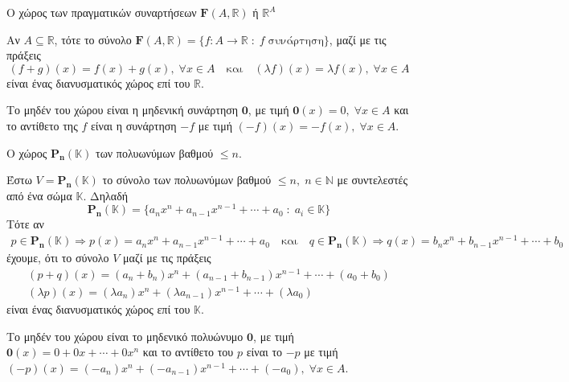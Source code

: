 \begin{example}\label{ex:funs} 
  \textcolor{Col2}{Ο χώρος των πραγματικών συναρτήσεων 
  $\mathbf{F}(A, \mathbb{R})$ ή $\mathbb{R} ^{A}$}

  Αν $ A \subseteq \mathbb{R} $, τότε το σύνολο 
  $ \mathbf{F}{(A, \mathbb{R})} = 
  \{ f \colon A \to \mathbb{R} \; : \; f \; \text{συνάρτηση} \} $, μαζί με 
  τις πράξεις
  \[
    (f+g)(x) = f(x) +g(x), \; \forall x \in A \quad \text{και} 
    \quad (\lambda f)(x)= \lambda f(x), \; \forall x \in A
  \] 
  είναι ένας διανυσματικός χώρος επί του $ \mathbb{R} $.

  Το μηδέν του χώρου είναι η μηδενική συνάρτηση $ \mathbf{0} $, με τιμή 
  $ \mathbf{0}(x)=0, \; \forall x \in A $ και το αντίθετο της $f$ είναι 
  η συνάρτηση $ -f $ με τιμή $ (-f)(x) = - f(x), \; \forall x \in A $.
\end{example}

\begin{example}
  \textcolor{Col2}{Ο χώρος $\mathbf{P_{n}(\mathbb{K})}$ των 
  πολυωνύμων βαθμού $ \leq n $}.

  Έστω $ V = \mathbf{P_{n}}(\mathbb{K}) $ το σύνολο των πολυωνύμων βαθμού 
  $ \leq n, \; n \in \mathbb{N}  $ με συντελεστές από ένα σώμα 
  $ \mathbb{K} $. Δηλαδή 
  \[
    \mathbf{P_{n}}(\mathbb{K}) = \{ a_{n}x^{n}+a_{n-1}x^{n-1}+\cdots +
    a_{0} \; : \; a_{i} \in \mathbb{K} \}  
  \]
  Τότε αν 
  \begin{gather*}
    p \in \mathbf{P_{n}}(\mathbb{K}) \Rightarrow p(x)
    = a_{n}x^{n}+a_{n-1}x^{n-1}+\cdots + a_{0} \quad \text{και} 
    \quad q \in \mathbf{P_{n}}(\mathbb{K}) \Rightarrow 
    q(x) = b_{n}x^{n}+b_{n-1}x^{n-1}+\cdots + b_{0} 
  \end{gather*} 
  έχουμε, ότι το σύνολο $ V $ μαζί με τις πράξεις 
  \begin{gather*}
    (p+q)(x) = (a_{n}+ b_{n})x^{n} + 
    (a_{n-1}+b_{n-1})x^{n-1}+ \cdots + (a_{0}+ b_{0}) \\
    (\lambda p)(x) = (\lambda a_{n})x^{n}+
    ( \lambda a_{n-1})x^{n-1}+ \cdots + ( \lambda a_{0})
  \end{gather*} 
  είναι ένας διανυσματικός χώρος επί του $ \mathbb{K} $.

  Το μηδέν του χώρου είναι το μηδενικό πολυώνυμο $ \mathbf{0} $, 
  με τιμή $ \mathbf{0}(x)=0+0x+\cdots +0x^{n} $ και το αντίθετο του 
  $p$ είναι το $ - p $ με τιμή $ (- p)(x) = 
  (-a_{n})x^{n}+(-a_{n-1})x^{n-1}+\cdots + (-a_{0}), \; \forall x \in A $.  
\end{example}

